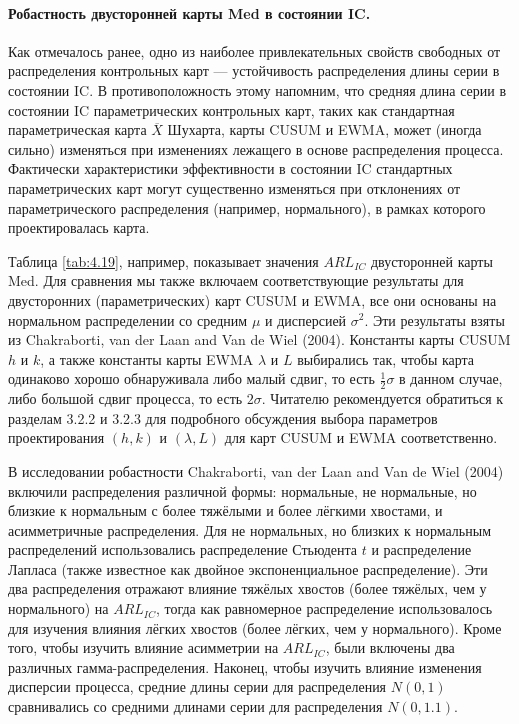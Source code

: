 \paragraph{Робастность двусторонней карты Med в состоянии IC.} Как отмечалось ранее, одно из наиболее привлекательных свойств свободных от распределения контрольных карт --- устойчивость распределения длины серии в состоянии IC. В противоположность этому напомним, что средняя длина серии в состоянии IC параметрических контрольных карт, таких как стандартная параметрическая карта \(\overline{X}\) Шухарта, карты CUSUM и EWMA, может (иногда сильно) изменяться при изменениях лежащего в основе распределения процесса. Фактически характеристики эффективности в состоянии IC стандартных параметрических карт могут существенно изменяться при отклонениях от параметрического распределения (например, нормального), в рамках которого проектировалась карта.

Таблица \ref{tab:4.19}, например, показывает значения \(ARL_{IC}\) двусторонней карты Med. Для сравнения мы также включаем соответствующие результаты для двусторонних (параметрических) карт CUSUM и EWMA, все они основаны на нормальном распределении со средним \(\mu\) и дисперсией \(\sigma^2\). Эти результаты взяты из Chakraborti, van der Laan and Van de Wiel (2004). Константы карты CUSUM \(h\) и \(k\), а также константы карты EWMA \(\lambda\) и \(L\) выбирались так, чтобы карта одинаково хорошо обнаруживала либо малый сдвиг, то есть \(\tfrac{1}{2}\sigma\) в данном случае, либо большой сдвиг процесса, то есть \(2\sigma\). Читателю рекомендуется обратиться к разделам 3.2.2 и 3.2.3 для подробного обсуждения выбора параметров проектирования \((h, k)\) и \((\lambda, L)\) для карт CUSUM и EWMA соответственно.

В исследовании робастности Chakraborti, van der Laan and Van de Wiel (2004) включили распределения различной формы: нормальные, не нормальные, но близкие к нормальным с более тяжёлыми и более лёгкими хвостами, и асимметричные распределения. Для не нормальных, но близких к нормальным распределений использовались распределение Стьюдента \(t\) и распределение Лапласа (также известное как двойное экспоненциальное распределение). Эти два распределения отражают влияние тяжёлых хвостов (более тяжёлых, чем у нормального) на \(ARL_{IC}\), тогда как равномерное распределение использовалось для изучения влияния лёгких хвостов (более лёгких, чем у нормального). Кроме того, чтобы изучить влияние асимметрии на \(ARL_{IC}\), были включены два различных гамма-распределения. Наконец, чтобы изучить влияние изменения дисперсии процесса, средние длины серии для распределения \(N(0, 1)\) сравнивались со средними длинами серии для распределения \(N(0, 1.1)\).

